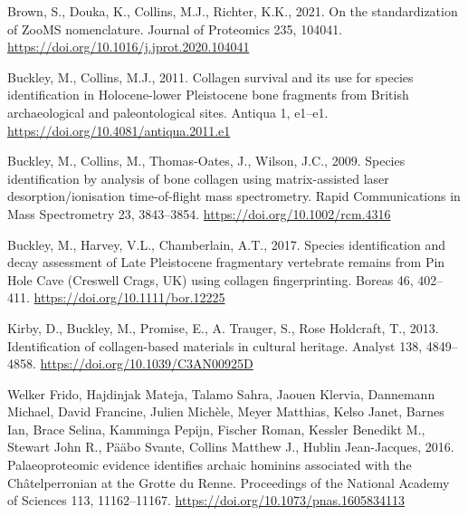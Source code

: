 \documentclass[
]{article}
\newlength{\cslhangindent}
\newlength{\cslentryspacingunit} %
\newenvironment{CSLReferences}[2] %
 {%
  \setlength{\parindent}{0pt}
  \ifodd #1
  \let\oldpar\par
  \def\par{\hangindent=\cslhangindent\oldpar}
  \fi
  \setlength{\parskip}{#2\cslentryspacingunit}
 }%
 {}
\begin{document}
\hypertarget{refs}{}
\begin{CSLReferences}{1}{0}
\leavevmode{}%
Brown, S., Douka, K., Collins, M.J., Richter, K.K., 2021. On the standardization of {ZooMS} nomenclature. Journal of Proteomics 235, 104041. \url{https://doi.org/10.1016/j.jprot.2020.104041}

\leavevmode{}%
Buckley, M., Collins, M.J., 2011. Collagen survival and its use for species identification in {Holocene-lower Pleistocene} bone fragments from {British} archaeological and paleontological sites. Antiqua 1, e1--e1. \url{https://doi.org/10.4081/antiqua.2011.e1}

\leavevmode{}%
Buckley, M., Collins, M., Thomas‐Oates, J., Wilson, J.C., 2009. Species identification by analysis of bone collagen using matrix-assisted laser desorption/ionisation time-of-flight mass spectrometry. Rapid Communications in Mass Spectrometry 23, 3843--3854. \url{https://doi.org/10.1002/rcm.4316}

\leavevmode{}%
Buckley, M., Harvey, V.L., Chamberlain, A.T., 2017. Species identification and decay assessment of {Late Pleistocene} fragmentary vertebrate remains from {Pin Hole Cave} ({Creswell Crags}, {UK}) using collagen fingerprinting. Boreas 46, 402--411. \url{https://doi.org/10.1111/bor.12225}

\leavevmode{}%
Kirby, D., Buckley, M., Promise, E., A. Trauger, S., Rose Holdcraft, T., 2013. Identification of collagen-based materials in cultural heritage. Analyst 138, 4849--4858. \url{https://doi.org/10.1039/C3AN00925D}

\leavevmode{}%
Welker Frido, Hajdinjak Mateja, Talamo Sahra, Jaouen Klervia, Dannemann Michael, David Francine, Julien Michèle, Meyer Matthias, Kelso Janet, Barnes Ian, Brace Selina, Kamminga Pepijn, Fischer Roman, Kessler Benedikt M., Stewart John R., Pääbo Svante, Collins Matthew J., Hublin Jean-Jacques, 2016. Palaeoproteomic evidence identifies archaic hominins associated with the {Châtelperronian} at the {Grotte} du {Renne}. Proceedings of the National Academy of Sciences 113, 11162--11167. \url{https://doi.org/10.1073/pnas.1605834113}

\end{CSLReferences}
\end{document}
